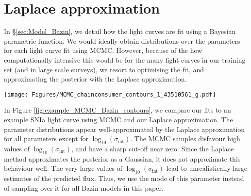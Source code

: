 \documentclass[fleqn,usenatbib]{mnras}
\begin{document}


\section{Laplace approximation}
\label{sec:Appendix_Fisher_matrix_approximation}
In \S\ref{sec:Model_Bazin}, we detail how the light curves are fit using a Bayesian parametric function. We would ideally obtain distributions over the parameters for each light curve fit using MCMC. However, because of the how computationally intensive this would be for the many light curves in our training set (and in large scale surveys), we resort to optimising the fit, and approximating the posterior with the Laplace approximation.

\begin{figure*}
    \centering
    \texttt{[image: Figures/MCMC\_chainconsumer\_contours\_1\_43510561\_g.pdf]}
    \caption[Example Bazin fit parameter distributions of example SNIa light curve using MCMC samples and the Laplace approximation.]{Example Bazin fit parameter distributions of example simulated SNIa light curve using MCMC samples and the Laplace approximation. The dashed lines shows the optimal fit from the Nelder-Mead optimisation routine.}
    \label{fig:example_MCMC_Bazin_contours}
\end{figure*}

In Figure \ref{fig:example_MCMC_Bazin_contours}, we compare our fits to an example SNIa light curve using MCMC and our Laplace approximation. The parameter distributions appear well-approximated by the Laplace approximation for all parameters except for $\log_{10}{(\sigma_{\mathrm{int}})}$. The MCMC samples disfavour high values of $\log_{10}{(\sigma_{\mathrm{int}})}$, and have a sharp cut-off near zero. Since the Laplace method approximates the posterior as a Gaussian, it does not approximate this behaviour well. The very large values of $\log_{10}{(\sigma_{\mathrm{int}})}$ lead to unrealistically large estimates of the predicted flux. Thus, we use the mode of this parameter instead of sampling over it for all Bazin models in this paper.
\end{document}
